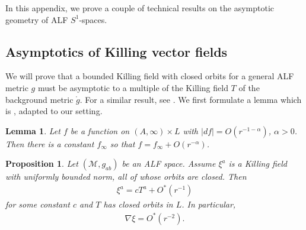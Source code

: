 \documentclass[a4paper,10pt,reqno]{amsart}
\newcommand{\cM}{\mathcal{M}}
\theoremstyle{plain}
\newtheorem{lemma}[thm]{Lemma}
\newtheorem{prop}[thm]{Proposition}
\newcommand{\gring}{\mathring{g}}
\numberwithin{equation}{section}
\begin{document}
In this appendix, we prove a couple of technical results on the asymptotic geometry of ALF $S^1$-spaces.  

\subsection{Asymptotics of Killing vector fields} \label{sec:asympKill}
We will prove that a bounded Killing field with closed orbits for a general ALF metric $g$ must be asymptotic to a multiple of the Killing field $T$ of the background metric $\gring$. For a similar result, see \cite[Proposition~2.1]{Beig-Chrusciel-96}. We first formulate a lemma which is \cite[Lemma,~Appendix~A]{Chrusciel-88}, adapted to our setting.

\begin{lemma} \label{lemma-piotr-limit}
Let $f$ be a function on $ (A,\infty) \times L$ with $|df| = O(r^{-1-\alpha})$, $\alpha >0$. Then there is a constant $f_\infty$ so that $f = f_\infty + O(r^{-\alpha})$. 
\end{lemma}
\begin{prop} \label{prop-asymptotics-killing}
Let $(\cM, g_{ab})$ be an ALF space. Assume $\xi^a$ is a Killing field with uniformly bounded norm, all of whose orbits are closed. 
Then  
\begin{align} \label{eq:xiO*}
\xi^a = cT^a + O^*(r^{-1})
\end{align} 
for some constant $c$ and $T$ has closed orbits in $L$. In particular, 
\begin{align} \label{eq:nablaxiO*}
\nabla\xi = O^*(r^{-2}).
\end{align}  
\end{prop}
\end{document}
